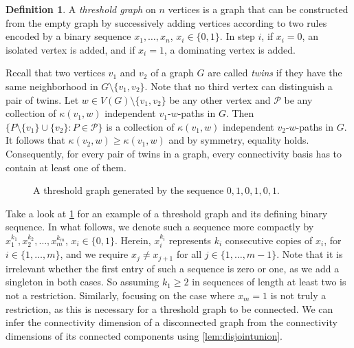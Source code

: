\documentclass[letterpaper,12pt,headings=normal,parskip=half]{scrartcl}
\theoremstyle{definition}
\newtheorem{definition}[theorem]{Definition}
\begin{document}
\begin{definition}
    A \emph{threshold graph} on $n$ vertices is a graph that can be constructed from the empty graph by successively adding vertices according to two rules encoded by a binary sequence $x_1,\ldots, x_n$, $x_i\in\{0,1\}$.
    In step $i$, if $x_i=0$, an isolated vertex is added, and if $x_i=1$, a dominating vertex is added.
\end{definition}

Recall that two vertices $v_1$ and $v_2$ of a graph $G$ are called \emph{twins} if they have the same neighborhood in $G\setminus\{v_1,v_2\}$. 
Note that no third vertex can distinguish a pair of twins. 
Let $w\in V(G)\setminus\{v_1,v_2\}$ be any other vertex and $\mathcal{P}$ be any collection of $\kappa(v_1,w)$ independent $v_1$-$w$-paths in $G$. 
Then $\{P\setminus\{v_1\}\cup\{v_2\}:P\in\mathcal{P}\}$ is a collection of $\kappa(v_1,w)$ independent $v_2$-$w$-paths in $G$. 
It follows that $\kappa(v_2,w)\geq\kappa(v_1,w)$ and by symmetry, equality holds. 
Consequently, for every pair of twins in a graph, every connectivity basis has to contain at least one of them.

\begin{figure}
\centering
{}
\caption{A threshold graph generated by the sequence $0,1,0,1,0,1$.}
\label{fig:threshold}
\end{figure}
Take a look at \cref{fig:threshold} for an example of a threshold graph and its defining binary sequence.
In what follows, we denote such a sequence more compactly by $x_1^{k_1},x_2^{k_2},\ldots, x_m^{k_m}$, $x_i\in\{0,1\}$.
Herein, $x_i^{k_i}$ represents $k_i$ consecutive copies of $x_i$, for $i\in\{1,\ldots,m\}$, and we require $x_j\neq x_{j+1}$ for all $j\in\{1,\ldots,m-1\}$. Note that it is irrelevant whether the first entry of such a sequence is zero or one, as we add a singleton in both cases. So assuming $k_1\geq 2$ in sequences of length at least two is not a restriction.
Similarly, focusing on the case where $x_m=1$ is not truly a restriction, as this is necessary for a threshold graph to be connected.
We can infer the connectivity dimension of a disconnected graph from the connectivity dimensions of its connected components using \cref{lem:disjointunion}. 
\end{document}

